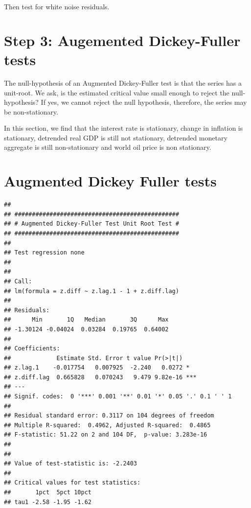 \documentclass[11pt,preprint, authoryear]{elsarticle}
\numberwithin{equation}{section}
\numberwithin{figure}{section}
\numberwithin{table}{section}
\begin{document}
Then test for white noise residuals.

\hypertarget{step-3-augemented-dickey-fuller-tests}{%
\section{Step 3: Augemented Dickey-Fuller
tests}\label{step-3-augemented-dickey-fuller-tests}}

The null-hypothesis of an Augmented Dickey-Fuller test is that the
series has a unit-root. We ask, is the estimated critical value small
enough to reject the null-hypothesis? If yes, we cannot reject the null
hypothesis, therefore, the series may be non-stationary.

In this section, we find that the interest rate is stationary, change in
inflation is stationary, detrended real GDP is still not stationary,
detrended monetary aggregate is still non-stationary and world oil price
is non stationary.

\hypertarget{augmented-dickey-fuller-tests}{%
\section{Augmented Dickey Fuller
tests}\label{augmented-dickey-fuller-tests}}

\begin{verbatim}
## 
## ############################################### 
## # Augmented Dickey-Fuller Test Unit Root Test # 
## ############################################### 
## 
## Test regression none 
## 
## 
## Call:
## lm(formula = z.diff ~ z.lag.1 - 1 + z.diff.lag)
## 
## Residuals:
##      Min       1Q   Median       3Q      Max 
## -1.30124 -0.04024  0.03284  0.19765  0.64002 
## 
## Coefficients:
##             Estimate Std. Error t value Pr(>|t|)    
## z.lag.1    -0.017754   0.007925  -2.240   0.0272 *  
## z.diff.lag  0.665828   0.070243   9.479 9.82e-16 ***
## ---
## Signif. codes:  0 '***' 0.001 '**' 0.01 '*' 0.05 '.' 0.1 ' ' 1
## 
## Residual standard error: 0.3117 on 104 degrees of freedom
## Multiple R-squared:  0.4962, Adjusted R-squared:  0.4865 
## F-statistic: 51.22 on 2 and 104 DF,  p-value: 3.283e-16
## 
## 
## Value of test-statistic is: -2.2403 
## 
## Critical values for test statistics: 
##       1pct  5pct 10pct
## tau1 -2.58 -1.95 -1.62
\end{verbatim}
\end{document}

